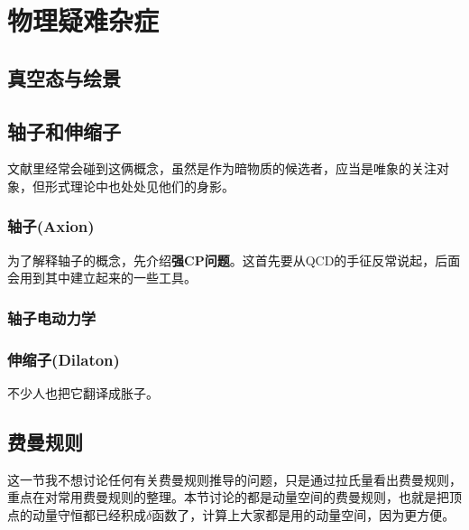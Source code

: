 \chapter{物理疑难杂症}
\section{真空态与绘景}
\section{轴子和伸缩子}\label{A.2}
文献里经常会碰到这俩概念，虽然是作为暗物质的候选者，应当是唯象的关注对象，但形式理论中也处处见他们的身影。
\subsection{轴子(Axion)}
为了解释轴子的概念，先介绍\textbf{强CP问题}。这首先要从QCD的手征反常说起，后面会用到其中建立起来的一些工具。

\subsection{轴子电动力学}

\subsection{伸缩子(Dilaton)}
不少人也把它翻译成胀子。
\section{费曼规则}
这一节我不想讨论任何有关费曼规则推导的问题，只是通过拉氏量看出费曼规则，重点在对常用费曼规则的整理。本节讨论的都是动量空间的费曼规则，也就是把顶点的动量守恒都已经积成$\delta$函数了，计算上大家都是用的动量空间，因为更方便。
